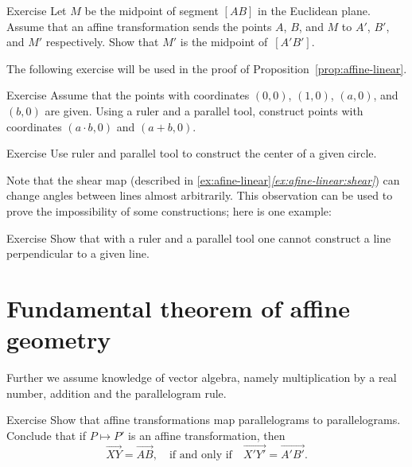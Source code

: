 \begin{thm}{Exercise}\label{ex:midpoint-affine}
Let $M$ be the midpoint of segment $[AB]$ in the Euclidean plane.
Assume that an affine transformation sends the points $A$, $B$, and $M$
to $A'$, $B'$, and $M'$ respectively.
Show that $M'$ is the midpoint of~$[A'B']$.
\end{thm}

The following exercise will be used in the proof of Proposition~\ref{prop:affine-linear}.

\begin{thm}{Exercise}\label{ex:R-hom}
Assume that the points with coordinates $(0,0)$, $(1,0)$, $(a,0)$, and $(b,0)$ are given.
Using a ruler and a parallel tool, construct points with coordinates $(a\cdot b,0)$ and $(a+b,0)$.
\end{thm}

\begin{thm}{Exercise}\label{ex:center-circ-affine}
Use ruler and parallel tool to construct the center of a given circle.
\end{thm}

Note that the shear map (described in \ref{ex:afine-linear}\textit{\ref{ex:afine-linear:shear}}) can change angles between lines almost arbitrarily.
This observation can be used to prove the impossibility of some constructions;
here is one example:

\begin{thm}{Exercise}\label{ex:affine-perp}
Show that with a ruler and a parallel tool one cannot construct a line perpendicular to a given line.
\end{thm}

\section*{Fundamental theorem of affine geometry}

Further we assume knowledge of vector algebra, namely multiplication by a real number, addition and the parallelogram rule.

\begin{thm}{Exercise}\label{ex:parallelogram-rule}
Show that affine transformations map parallelograms to parallelograms.
Conclude that if $P\mapsto P'$ is an affine transformation, then
\[\overrightarrow{XY}=\overrightarrow{AB},
\quad\text{if and only if}\quad
\overrightarrow{X'Y'}=\overrightarrow{A'B'}.\]

\end{thm}


